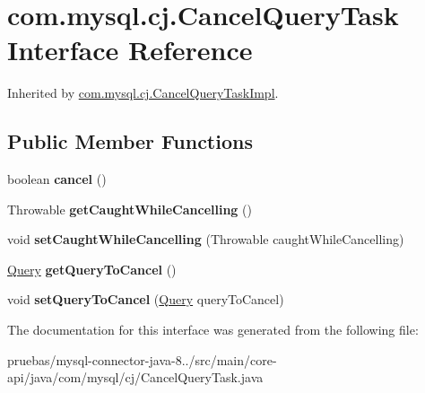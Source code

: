 \hypertarget{interfacecom_1_1mysql_1_1cj_1_1_cancel_query_task}{}\section{com.\+mysql.\+cj.\+Cancel\+Query\+Task Interface Reference}
\label{interfacecom_1_1mysql_1_1cj_1_1_cancel_query_task}


Inherited by \mbox{\hyperlink{classcom_1_1mysql_1_1cj_1_1_cancel_query_task_impl}{com.\+mysql.\+cj.\+Cancel\+Query\+Task\+Impl}}.

\subsection*{Public Member Functions}
\begin{DoxyCompactItemize}
\item 
\mbox{\label{interfacecom_1_1mysql_1_1cj_1_1_cancel_query_task_a03c962300939f773da40e8e6b451fb8c}} 
boolean {\bfseries cancel} ()
\item 
\mbox{\label{interfacecom_1_1mysql_1_1cj_1_1_cancel_query_task_a034f915ab5a54b244d44e462421d7036}} 
Throwable {\bfseries get\+Caught\+While\+Cancelling} ()
\item 
\mbox{\label{interfacecom_1_1mysql_1_1cj_1_1_cancel_query_task_aacd2c076a44dd83a7d4140278ae9d0b9}} 
void {\bfseries set\+Caught\+While\+Cancelling} (Throwable caught\+While\+Cancelling)
\item 
\mbox{\label{interfacecom_1_1mysql_1_1cj_1_1_cancel_query_task_a676c3131b684b869e322954254116b87}} 
\mbox{\hyperlink{interfacecom_1_1mysql_1_1cj_1_1_query}{Query}} {\bfseries get\+Query\+To\+Cancel} ()
\item 
\mbox{\label{interfacecom_1_1mysql_1_1cj_1_1_cancel_query_task_ab9f6e0f8efcfd3f4b275bb1eb927b933}} 
void {\bfseries set\+Query\+To\+Cancel} (\mbox{\hyperlink{interfacecom_1_1mysql_1_1cj_1_1_query}{Query}} query\+To\+Cancel)
\end{DoxyCompactItemize}


The documentation for this interface was generated from the following file\+:\begin{DoxyCompactItemize}
\item 
pruebas/mysql-\/connector-\/java-\/8../src/main/core-\/api/java/com/mysql/cj/Cancel\+Query\+Task.\+java\end{DoxyCompactItemize}
